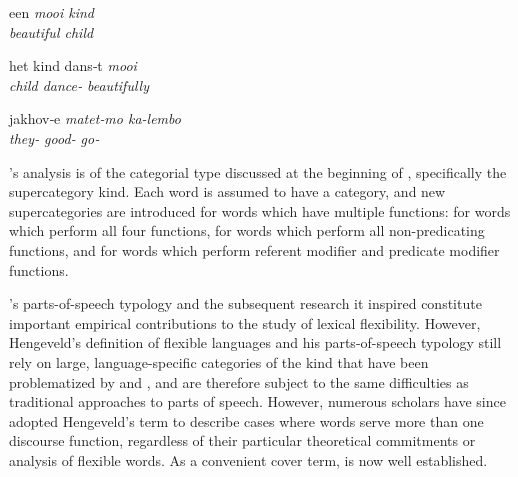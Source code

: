 \begin{exe}

  \ex\label{ex:2.3}
  \begin{xlist}

    \ex\label{ex:2.3a}
    \gll een        \em{mooi}      kind\\
          \em{beautiful} child\\

    \ex\label{ex:2.3b}
    \gll het      kind  dans‑t              \em{mooi}\\
          child dance‑ \em{beautifully}\\

  \end{xlist}

  \ex\label{ex:2.4}
  \gll jakhov‑e       \em{matet‑mo}         ka-lembo\\
       they‑ \em{good‑} go‑\\
  \hfill\hspace*{1em}\mbox{\footnotesize{}\normalsize}

\end{exe}

\citeauthor{Hengeveld1992}'s analysis is of the categorial type discussed at the beginning of , specifically the supercategory kind. Each word is assumed to have a category, and new supercategories are introduced for words which have multiple functions:  for words which perform all four functions,  for words which perform all non-predicating functions, and  for words which perform referent modifier and predicate modifier functions.

\citeauthor{Hengeveld1992}'s parts-of-speech typology and the subsequent research it inspired \parencites{DonLier2013}{HengeveldRijkhoff2005}{Lier2006}{HengeveldLier2012}{Luuk2010}{LierRijkhoff2013}{Lier2016} constitute important empirical contributions to the study of lexical flexibility. However, Hengeveld's definition of flexible languages and his parts-of-speech typology still rely on large, language-specific categories of the kind that have been problematized by \textcite[§2.2.2]{Croft2001b} and \textcite{CroftLier2012}, and are therefore subject to the same difficulties as traditional approaches to parts of speech. However, numerous scholars have since adopted Hengeveld's term  to describe cases where words serve more than one discourse function, regardless of their particular theoretical commitments or analysis of flexible words. As a convenient cover term,  is now well established.

